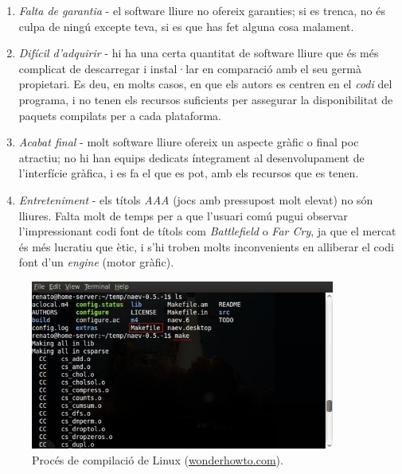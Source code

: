 \begin{enumerate}
\item \emph{Falta de garantia} - el software lliure no ofereix garanties; si es trenca, no és culpa de ningú excepte teva, si es que has fet alguna cosa malament.
\item \emph{Difícil d'adquirir} - hi ha una certa quantitat de software lliure que és més complicat de descarregar i instal·lar en comparació amb el seu germà propietari. Es deu, en molts casos, en que els autors es centren en el \emph{codi} del programa, i no tenen els recursos suficients per assegurar la disponibilitat de paquets compilats per a cada plataforma.
\item \emph{Acabat final} - molt software lliure ofereix un aspecte gràfic o final poc atractiu; no hi han equips dedicats íntegrament al desenvolupament de l'interfície gràfica, i es fa el que es pot, amb els recursos que es tenen.
\item \emph{Entreteniment} - els títols \emph{AAA} (jocs amb pressupost molt elevat) no són lliures. Falta molt de temps per a que l'usuari comú pugui observar l'impressionant codi font de títols com \emph{Battlefield} o \emph{Far Cry}, ja que el mercat és més lucratiu que ètic, i s'hi troben molts inconvenients en alliberar el codi font d'un \emph{engine} (motor gràfic).
\end{enumerate}

\begin{figure}[ht!]
\centering
\includegraphics[width=100mm]{data/linuxcompile.jpg}
\caption{Procés de compilació de Linux (\href{http://renatonel.wonderhowto.com/inspiration/first-steps-compiling-program-linux-0127658/}{wonderhowto.com}).}
\label{websshare}
\end{figure}